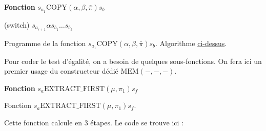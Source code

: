\begin{appendices}
		
		\begin{algorithm}[H]
			\label{prog:A_RAM_fn_COPY}

			\textbf{Fonction} $s_{a_1}\text{COPY}(\alpha, \beta, \bar{\pi}) s_b$
			
			
			\espace 
			
			
			
			(switch) 	$s_{a_{r+1}} \alpha s_{b_1} \dots s_{b_k}$\;
			
			
			
			\caption{Programme de la fonction $s_{a_1}\text{COPY}(\alpha, \beta, \bar{\pi}) s_b$. Algorithme \hyperref[algo:A_RAM_fn_COPY]{ci-dessus}.}
		\end{algorithm}
		
		\espace
		
		Pour coder le test d'égalité, on a besoin de quelques sous-fonctions. On fera ici un premier usage du constructeur dédié $\text{MEM}\left( -, -, -\right)$.
		
		\espace
		
		\begin{algorithm}[H]
			\label{algo:A_RAM_fn_extract_first}
			
			\textbf{Fonction} $s_a \text{EXTRACT\_FIRST}(\mu, \pi_1) s_f$

			\espace 
			
			
			
			\caption{Fonction $s_a \text{EXTRACT\_FIRST}(\mu, \pi_1) s_f$. }
		\end{algorithm}
		
		\espace
		
		Cette fonction calcule en $3$ étapes. Le code se trouve ici :
		

\end{appendices}
